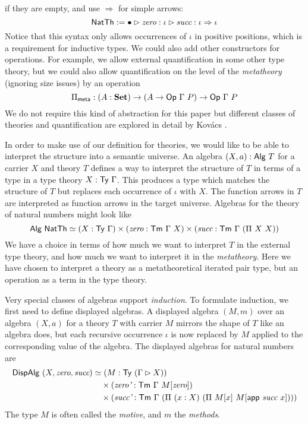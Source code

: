 if they are empty, and use $\Rightarrow$ for simple arrows:
\[
\textsf{NatTh} := \bullet \rhd \textit{zero} : \iota \rhd \textit{succ} : \iota \Rightarrow \iota
\]
Notice that this syntax only allows occurrences of $\iota$ in positive
positions, which is a requirement for inductive types.
We could also add other constructors for operations. For example, we allow
external quantification in some other type theory, but we could also allow quantification
on the level of the \emph{metatheory} (ignoring size issues) by an operation
\[
\Pi_{\textsf{meta}} : (A : \mathbf{Set}) \to (A \to \textsf{Op}\ \Gamma\ P) \to \textsf{Op}\ \Gamma\ P
\]
We do not require this kind of abstraction for this paper but different classes of
theories and quantification are explored in detail by Kov\'acs \cite{Kovacs2023-gq}.

In order to make use of our definition for theories, we would like to be able to interpret
the structure into a semantic universe. An algebra $(X, a) : \textsf{Alg}\ T$
for a carrier $X$ and theory $T$ defines a way to interpret the structure of $T$
in terms of a type in a type theory $X : \textsf{Ty}\ \Gamma$. This produces a type which
matches the structure of $T$ but replaces each occurrence of $\iota$ with $X$.
The function arrows in $T$ are interpreted as function arrows in the target universe.
Algebras for the theory of natural numbers might look like
\[
	\mta{Alg}\ \mta{NatTh}\simeq (X : \Ty\ \Gamma) \times (\textit{zero} : \Tm\ \Gamma\ X) \times (\textit{succ} : \Tm\ \Gamma\ (\Pi\ X\ X))
\]
We have a choice in terms of how much we want to interpret $T$ in the external type theory,
and how much we want to interpret it in the \emph{metatheory}. Here we have chosen to interpret
a theory as a metatheoretical iterated pair type, but an operation as a term in the type theory.

Very special classes of algebras support \emph{induction}.
To formulate induction, we first need to define displayed algebras.
A displayed algebra $(M, m)$ over an algebra $(X, a)$ for a theory $T$ with
carrier $M$ mirrors the shape of $T$ like an algebra does, but each recursive
occurrence $\iota$ is now replaced by $M$ applied to the corresponding value of
the algebra. The displayed algebras for natural numbers are
\begin{align*}
	\mta{DispAlg}\ (X, \textit{zero}, \textit{succ}) & \simeq (M : \Ty\ (\Gamma \rhd X))                                                      \\
	                               & \quad \times (\textit{zero'} : \Tm\ \Gamma\ M[\textit{zero}])                                            \\
	                               & \quad \times (\textit{succ'} : \Tm\ \Gamma\ (\Pi\ (x : X)\ (\Pi\ M[x]\ M[\mta{app}\ \textit{succ}\ x])))
\end{align*}
The type $M$ is often called the \emph{motive}, and $m$ the \emph{methods}.

